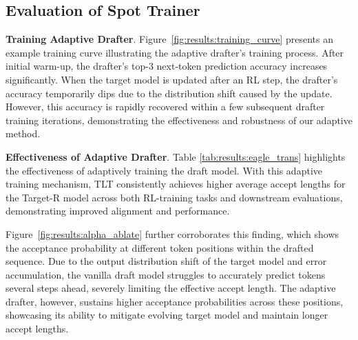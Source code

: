 \documentclass[sigplan,screen]{acmart}
\newcommand{\SysName}{\textrm{TLT}\xspace}
\begin{document}
\vspace{-5pt}

\subsection{Evaluation of Spot Trainer}


\noindent\textbf{Training Adaptive Drafter}.
Figure~\ref{fig:results:training_curve} presents an example training curve illustrating the adaptive drafter's training process. After initial warm-up, the drafter's top-3 next-token prediction accuracy increases significantly. When the target model is updated after an RL step, the drafter's accuracy temporarily dips due to the distribution shift caused by the update. However, this accuracy is rapidly recovered within a few subsequent drafter training iterations, demonstrating the effectiveness and robustness of our adaptive method.

\noindent\textbf{Effectiveness of Adaptive Drafter}.
Table \ref{tab:results:eagle_trans} highlights the effectiveness of adaptively training the draft model. With this adaptive training mechanism, \SysName consistently achieves higher average accept lengths for the Target-R model across both RL-training tasks and downstream evaluations, demonstrating improved alignment and performance.


%
\begin{table}[t]

\centering
\caption{\textbf{Bucketed CUDAGraph reduces memory footprint.} Numbers measured using Llama-3-8B on H100 GPUs (TP=4). Search space includes 4 different strategies.}

\label{tab:results:cuda_graph_mem}
\end{table} 
%


Figure~\ref{fig:results:alpha_ablate} further corroborates this finding, which shows the acceptance probability at different token positions within the drafted sequence. Due to the output distribution shift of the target model and error accumulation, the vanilla draft model struggles to accurately predict tokens several steps ahead, severely limiting the effective accept length. The adaptive drafter, however, sustains higher acceptance probabilities across these positions, showcasing its ability to mitigate evolving target model and maintain longer accept lengths.
\end{document}
